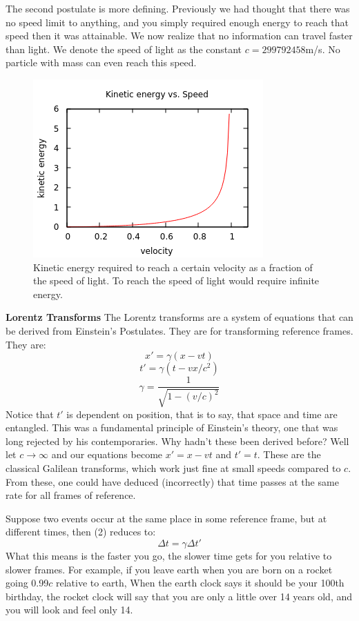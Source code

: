 \documentclass[conference]{IEEEtran}
\begin{document}
The second postulate is more defining. Previously we had thought that there was no speed limit to anything, and you simply required enough energy to reach that speed then it was attainable. We now realize that no information can travel faster than light. We denote the speed of light as the constant $c = 299792458$m/s. No particle with mass can even reach this speed.
\begin{figure}[ht!]
\includegraphics[scale=1]{./IMG/energyVsSpeed.png} 
\caption{Kinetic energy required to reach a certain velocity as a fraction of the speed of light. To reach the speed of light would require infinite energy.}
\end{figure}

\textbf{Lorentz Transforms} The Lorentz transforms are a system of equations that can be derived from Einstein's Postulates. They are for transforming reference frames. They are:
\begin{equation}
x' = \gamma(x - vt)
\end{equation}
\begin{equation} 
t' = \gamma(t - vx/c^2)
\end{equation}
\begin{equation}
\gamma = \frac{1}{\sqrt{1 - (v/c)^2}}
\end{equation}
Notice that $t'$ is dependent on position, that is to say, that space and time are entangled. This was a fundamental principle of Einstein's theory, one that was long rejected by his contemporaries. Why hadn't these been derived before? Well let $c \rightarrow \infty$ and our equations become $x' = x - vt$ and $t' = t$. These are the classical Galilean transforms, which work just fine at small speeds compared to $c$. From these, one could have deduced (incorrectly) that time passes at the same rate for all frames of reference. 

Suppose two events occur at the same place in some reference frame, but at different times, then (2) reduces to:
\begin{equation}
\Delta t = \gamma \Delta t'
\end{equation}
What this means is the faster you go, the slower time gets for you relative to slower frames. For example, if you leave earth when you are born on a rocket going 0.99$c$ relative to earth, When the earth clock says it should be your 100th birthday, the rocket clock will say that you are only a little over 14 years old, and you will look and feel only 14. 
\end{document}
